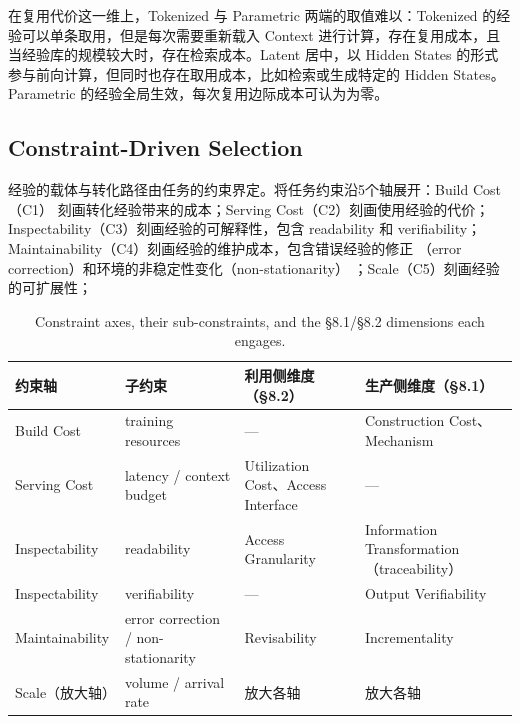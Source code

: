 在复用代价这一维上，Tokenized 与 Parametric 两端的取值难以：Tokenized 的经验可以单条取用，但是每次需要重新载入 Context 进行计算，存在复用成本，且当经验库的规模较大时，存在检索成本。Latent 居中，以 Hidden States 的形式参与前向计算，但同时也存在取用成本，比如检索或生成特定的 Hidden States。Parametric 的经验全局生效，每次复用边际成本可认为为零。

\subsection{Constraint-Driven Selection}
\label{sec:selection_constraints}

经验的载体与转化路径由任务的约束界定。将任务约束沿5个轴展开：Build Cost （C1） 刻画转化经验带来的成本；Serving Cost（C2）刻画使用经验的代价；Inspectability（C3）刻画经验的可解释性，包含 readability 和 verifiability；Maintainability（C4）刻画经验的维护成本，包含错误经验的修正 （error correction）和环境的非稳定性变化（non-stationarity） ；Scale（C5）刻画经验的可扩展性；


\begin{table}[htbp]
  \centering
  \caption{Constraint axes, their sub-constraints, and the \S8.1/\S8.2 dimensions each engages.}
  \label{tab:8.3}
  \begin{tabularx}{\textwidth}{llXX}
    \toprule
    约束轴 & 子约束 & 利用侧维度（\S8.2） & 生产侧维度（\S8.1） \\
    \midrule
    Build Cost
      & training resources
      & ---
      & Construction Cost、Mechanism \\
    Serving Cost
      & latency / context budget
      & Utilization Cost、Access Interface
      & --- \\
    Inspectability
      & readability
      & Access Granularity
      & Information Transformation（traceability） \\
    Inspectability
      & verifiability
      & ---
      & Output Verifiability \\
    Maintainability
      & error correction / non-stationarity
      & Revisability
      & Incrementality \\
    Scale（放大轴）
      & volume / arrival rate
      & 放大各轴
      & 放大各轴 \\
    \bottomrule
  \end{tabularx}
\end{table}



